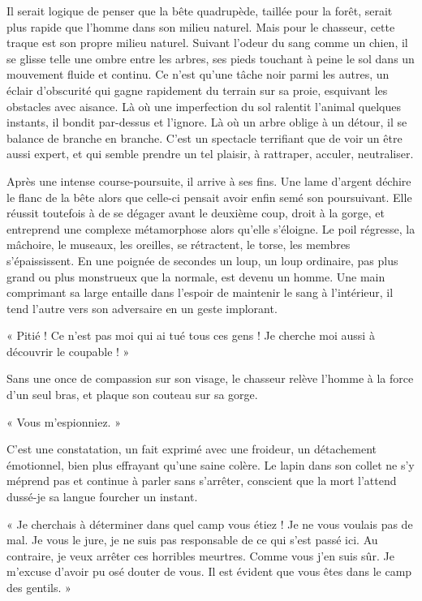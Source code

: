 \documentclass{report}
\begin{document}
Il serait logique de penser que la bête quadrupède, taillée pour la forêt, serait plus rapide que l'homme dans son milieu naturel. Mais pour le chasseur, cette traque est son propre milieu naturel. Suivant l'odeur du sang comme un chien, il se glisse telle une ombre entre les arbres, ses pieds touchant à peine le sol dans un mouvement fluide et continu. Ce n'est qu'une tâche noir parmi les autres, un éclair d'obscurité qui gagne rapidement du terrain sur sa proie, esquivant les obstacles avec aisance. Là où une imperfection du sol ralentit l'animal quelques instants, il bondit par-dessus et l'ignore. Là où un arbre oblige à un détour, il se balance de branche en branche. C'est un spectacle terrifiant que de voir un être aussi expert, et qui semble prendre un tel plaisir, à rattraper, acculer, neutraliser.

Après une intense course-poursuite, il arrive à ses fins. Une lame d'argent déchire le flanc de la bête alors que celle-ci pensait avoir enfin semé son poursuivant. Elle réussit toutefois à de se dégager avant le deuxième coup, droit à la gorge, et entreprend une complexe métamorphose alors qu'elle s'éloigne. Le poil régresse, la mâchoire, le museaux, les oreilles, se rétractent, le torse, les membres s'épaississent. En une poignée de secondes un loup, un loup ordinaire, pas plus grand ou plus monstrueux que la normale, est devenu un homme. Une main comprimant sa large entaille dans l'espoir de maintenir le sang à l'intérieur, il tend l'autre vers son adversaire en un geste implorant.

« Pitié ! Ce n'est pas moi qui ai tué tous ces gens ! Je cherche moi aussi à découvrir le coupable ! »

Sans une once de compassion sur son visage, le chasseur relève l'homme à la force d'un seul bras, et plaque son couteau sur sa gorge.

« Vous m'espionniez. » 

C'est une constatation, un fait exprimé avec une froideur, un détachement émotionnel, bien plus effrayant qu'une saine colère. Le lapin dans son collet ne s'y méprend pas et continue à parler sans s'arrêter, conscient que la mort l'attend dussé-je sa langue fourcher un instant.

« Je cherchais à déterminer dans quel camp vous étiez ! Je ne vous voulais pas de mal. Je vous le jure, je ne suis pas responsable de ce qui s'est passé ici. Au contraire, je veux arrêter ces horribles meurtres. Comme vous j'en suis sûr. Je m'excuse d'avoir pu osé douter de vous. Il est évident que vous êtes dans le camp des gentils. »
\end{document}

